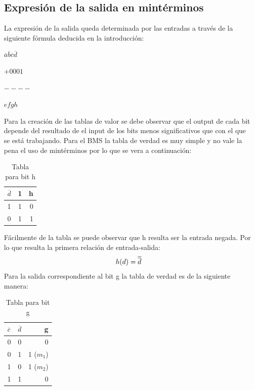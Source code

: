 \subsection{Expresión de la salida en mintérminos}
\hspace{10mm} La expresión de la salida queda determinada por las entradas a través de la siguiente fórmula deducida en la introducción:
\newline \centerline{$\overline{a} \overline{b} \overline{c} \overline{d}$}
\newline \centerline{$+0001$}
\newline \centerline{$----$}
\newline \centerline{$efgh$}	
\newline \hspace{10mm} Para la creación de las tablas de valor se debe observar que el output de cada bit depende del resultado de el input de los bits menos significativos que con el que se está trabajando.
\newline Para el BMS la tabla de verdad es muy simple y no vale la pena el uso de mintérminos por lo que se vera a continuación:
\begin{table}[h!]
	\begin{center}
		\caption{Tabla para bit h}
		\begin{tabular}{l|c|r}
			\textbf{$\overline{d}$} & \textbf{1} & \textbf{h} \\
			\hline
			1                       & 1          & 0          \\
			0                       & 1          & 1          \\			
		\end{tabular}
	\end{center}
\end{table}
\newline Fácilmente de la tabla se puede observar que h resulta ser la entrada negada. Por lo que resulta la primera relación de entrada-salida:
\begin{equation}
	\centerline{$h(d)=\overline{\overline{d}}$}
\end{equation}
\newline Para la salida correspondiente al bit g la tabla de verdad es de la siguiente manera:
\begin{table}[h!]
	\begin{center}
		\caption{Tabla para bit g}
		\begin{tabular}{l|c|r}
			\textbf{$\overline{c}$} & \textbf{$\overline{d}$} & \textbf{g}  \\
			\hline
			0                       & 0                       & 0           \\
			0                       & 1                       & 1 ($m_{1}$) \\	
			1                       & 0                       & 1 ($m_{2}$) \\
			1                       & 1                       & 0           \\			
		\end{tabular}
	\end{center}
\end{table}	
